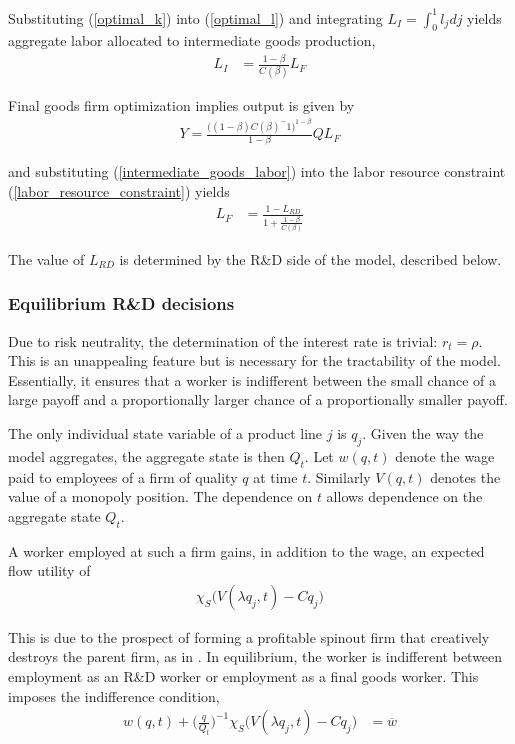 \documentclass[12pt,english]{article}
\theoremstyle{remark}
\begin{document}
Substituting (\ref{optimal_k}) into (\ref{optimal_l}) and integrating $L_I = \int_0^1 l_j dj$ yields aggregate labor allocated to intermediate goods production,
\begin{align}
	L_I &= \frac{1-\beta}{C(\beta)}L_F \label{intermediate_goods_labor}
\end{align}

Final goods firm optimization implies output is given by 
\begin{align}
	Y = \frac{\Big((1-\beta)C(\beta)^-1\Big)^{1-\beta}}{1-\beta} Q L_F
\end{align}

and substituting (\ref{intermediate_goods_labor}) into the labor resource constraint (\ref{labor_resource_constraint}) yields
\begin{align}
	L_F &= \frac{1 - L_{RD}}{1 + \frac{1-\beta}{C(\beta)}}
\end{align}

The value of $L_{RD}$ is determined by the R\&D side of the model, described below.

\subsubsection{Equilibrium R\&D decisions}

Due to risk neutrality, the determination of the interest rate is trivial: $r_t = \rho$. This is an unappealing feature but is necessary for the tractability of the model. Essentially, it ensures that a worker is indifferent between the small chance of a large payoff and a proportionally larger chance of a proportionally smaller payoff. 

The only individual state variable of a product line $j$ is $q_j$. Given the way the model aggregates, the aggregate state is then $Q_t$. Let $w(q,t)$ denote the wage paid to employees of a firm of quality $q$ at time $t$. Similarly $V(q,t)$ denotes the value of a monopoly position. The dependence on $t$ allows dependence on the aggregate state $Q_t$. 

A worker employed at such a firm gains, in addition to the wage, an expected flow utility of
\begin{align*}
	\chi_S \Big(V(\lambda q_j,t) - Cq_j \Big)
\end{align*}

This is due to the prospect of forming a profitable spinout firm that creatively destroys the parent firm, as in \cite{franco_spin-outs:_2006}. In equilibrium, the worker is indifferent between employment as an R\&D worker or employment as a final goods worker. This imposes the indifference condition,
\begin{align}
	w(q,t) + \Big(\frac{q}{Q_t}\Big)^{-1} \chi_S \Big(V(\lambda q_j,t) - Cq_j \Big) &= \overline{w} \label{simplified_wage_rd}
\end{align}
\end{document}
